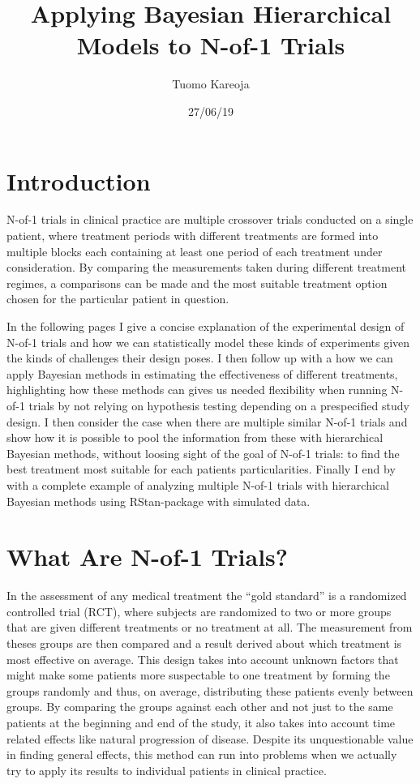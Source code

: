 \documentclass[12pt,a4paper,leqno]{report}
\title{Applying Bayesian Hierarchical Models to N-of-1 Trials}
\author{Tuomo Kareoja}
\date{27/06/19}
\theoremstyle{plain}
\theoremstyle{definition}
\theoremstyle{remark}
\begin{document}
\maketitle

\tableofcontents

\chapter*{Introduction}\label{intro}

N-of-1 trials in clinical practice are multiple crossover trials conducted on
a single patient, where treatment periods with different treatments are formed
into multiple blocks each containing at least one period of each treatment
under consideration\cite{nofone}. By comparing the measurements taken during
different treatment regimes, a comparisons can be
made and the most suitable treatment option chosen for the particular patient in question.

In the following pages I give a concise explanation of the experimental design
of N-of-1 trials and how we can statistically model these kinds of experiments
given the kinds of challenges their design poses.
I then follow up with a how we can apply Bayesian methods in estimating the
effectiveness of different treatments, highlighting how these methods can gives us
needed flexibility when running N-of-1 trials by not relying on hypothesis testing
depending on a prespecified study design. I then consider the case when there are
multiple similar N-of-1 trials and show how it is possible to pool the
information from these with hierarchical Bayesian methods, without loosing
sight of the goal of N-of-1 trials: to find the best
treatment most suitable for each patients particularities.
Finally I end by with a complete example of analyzing multiple N-of-1
trials with hierarchical Bayesian methods using RStan-package with simulated
data.

\chapter{What Are N-of-1 Trials?}\label{nof1}

In the assessment of any medical treatment the ``gold standard'' is a randomized
controlled trial (RCT), where subjects are randomized to two or more groups
that are given different treatments or no treatment at all. The measurement
from theses groups are then compared and a result derived about which treatment
is most effective on average. This design takes into account unknown factors
that might make some patients more suspectable to one treatment by forming the
groups randomly and thus, on average, distributing these patients evenly
between groups. By comparing the groups against each other and not just to the
same patients at the beginning and end of the study, it also takes into account
time related effects like natural progression of disease. Despite its
unquestionable value in finding general effects, this method can run into problems
when we actually try to apply its results to individual patients in clinical practice.
\end{document}
